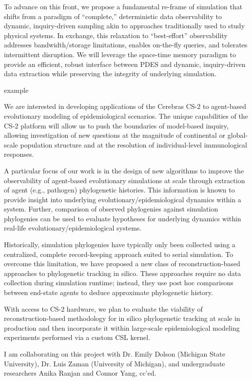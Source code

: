 To advance on this front, we propose a fundamental re-frame of simulation that shifts from a paradigm of ``complete,'' deterministic data observability to dynamic, inquiry-driven sampling akin to approaches traditionally used to study physical systems.
In exchange, this relaxation to ``best-effort'' observability addresses bandwidth/storage limitations, enables on-the-fly queries, and tolerates intermittent disruption.
We will leverage the space-time memory paradigm to provide an efficient, robust interface between PDES and dynamic, inquiry-driven data extraction while preserving the integrity of underlying simulation.


example \citep{gagliardi2019international}


We are interested in developing applications of the Cerebras CS-2 to agent-based evolutionary modeling of epidemiological scenarios.
The unique capabilities of the CS-2 platform will allow us to push the boundaries of model-based inquiry, allowing investigation of new questions at the magnitude of continental or global-scale population structure and at the resolution of individual-level immunological responses.

A particular focus of our work is in the design of new algorithms to improve the observability of agent-based evolutionary simulations at scale through extraction of agent (e.g., pathogen) phylogenetic histories.
This information is known to provide insight into underlying evolutionary/epidemiological dynamics within a system.
Further, comparison of observed phylogenies against simulation phylogenies can be used to evaluate hypotheses for underlying dynamics within real-life evolutionary/epidemiological systems.

Historically, simulation phylogenies have typically only been collected using a centralized, complete record-keeping approach suited to serial simulation.
To overcome this limitation, we have proposed a new class of reconstruction-based approaches to phylogenetic tracking in silico.
These approaches require no data collection during simulation runtime; instead, they use post hoc comparisons between end-state agents to deduce approximate phylogenetic history.


With access to CS-2 hardware, we plan to evaluate the viability of reconstruction-based methodology for in silico phylogenetic tracking at scale in production and then incorporate it within large-scale epidemiological modeling experiments performed via a custom CSL kernel.

I am collaborating on this project with Dr. Emily Dolson (Michigan State University), Dr. Luis Zaman (University of Michigan), and undergraduate researchers Anika Ranjan and Connor Yang, cc'ed.



